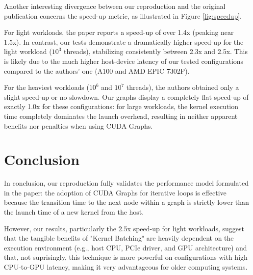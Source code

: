 \documentclass[10pt,twocolumn]{article}
\begin{document}
Another interesting divergence between our reproduction and the original publication concerns the speed-up metric, as illustrated in Figure \ref{fig:speedup}. 

For light workloads, the paper reports a speed-up of over 1.4x (peaking near 1.5x). In contrast, our tests demonstrate a dramatically higher speed-up for the light workload (\(10^3\) threads), stabilizing consistently between 2.3x and 2.5x. 
This is likely due to the much higher host-device latency of our tested configurations compared to the authors' one (A100 and AMD EPIC 7302P).

For the heaviest workloads (\(10^6\) and \(10^7\) threads), the authors obtained only a slight speed-up or no slowdown. Our graphs display a completely flat speed-up of exactly 1.0x for these configurations: for large workloads, the kernel execution time completely dominates the launch overhead, resulting in neither apparent benefits nor penalties when using CUDA Graphs.

\section{Conclusion}
In conclusion, our reproduction fully validates the performance model formulated in the paper: the adoption of CUDA Graphs for iterative loops is effective because the transition time to the next node within a graph is strictly lower than the launch time of a new kernel from the host. 

However, our results, particularly the 2.5x speed-up for light workloads, suggest that the tangible benefits of "Kernel Batching" are heavily dependent on the execution environment (e.g., host CPU, PCIe driver, and GPU architecture) and that, not suprisingly, this technique is more powerful on configurations with high CPU-to-GPU latency, making it very advantageous for older computing systems.
\clearpage

{}

\end{document}
